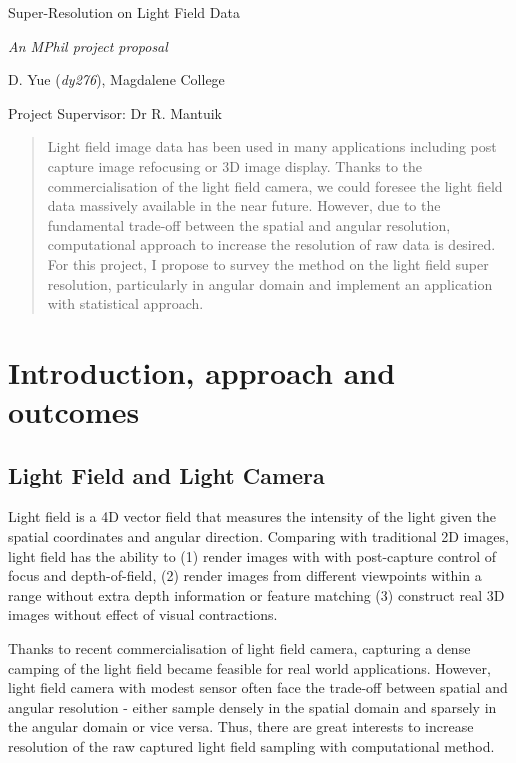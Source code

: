 \documentclass[11pt]{article}
\begin{document}
\centerline{\Large Super-Resolution on Light Field Data}
\vspace{2em}
\centerline{\Large \emph{An MPhil project proposal}}
\vspace{2em}
\centerline{\large D. Yue (\emph{dy276}), Magdalene College}
\vspace{1em}
\centerline{\large Project Supervisor: Dr R. Mantuik}
\vspace{1em}

\begin{abstract}
  Light field image data has been used in many applications including post
  capture image refocusing or 3D image display. Thanks to the commercialisation
  of the light field camera, we could foresee the light field data massively
  available in the near future. However, due to the fundamental trade-off
  between the spatial and angular resolution, computational approach to increase
  the resolution of raw data is desired. For this project, I propose to survey
  the method on the light field super resolution, particularly in angular domain
  and implement an application with statistical approach.
\end{abstract}

\section{Introduction, approach and outcomes}

\subsection*{Light Field and Light Camera}

Light field is a 4D vector field that measures the intensity of the light given
the spatial coordinates and angular direction. Comparing with traditional 2D
images, light field has the ability to (1) render images with with post-capture
control of focus and depth-of-field\cite{ng2005light}, (2) render images from
different viewpoints\cite{ng2005light} within a range without extra depth
information or feature matching (3) construct real 3D images without effect of
visual contractions.\cite{wetzstein2012tensor}

Thanks to recent commercialisation of light field camera\cite{georgiev2013lytro},
capturing a dense camping of the light field became feasible for real world
applications. However, light field camera with modest sensor often face the
trade-off between spatial and angular resolution - either sample densely in the
spatial domain and sparsely in the angular domain or vice versa. Thus, there are
great interests to increase resolution of the raw captured light field sampling
with computational method.
\end{document}

